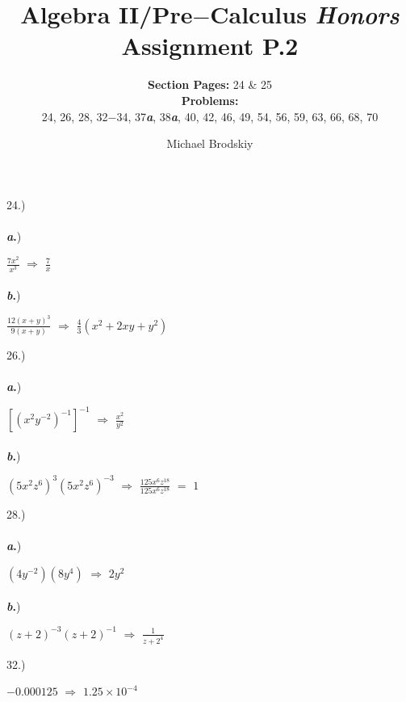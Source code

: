 \documentclass[12pt]{article}
\title{\textbf{Algebra II/Pre$-$Calculus \textit{Honors}}  \\ Assignment P.2}
\date{}
\subtitle{\textbf{Section Pages:} 24 \& 25\\\textbf{Problems:}\\24, 26, 28, 32$-$34, 37\textbf{\textit{a}}, 38\textbf{\textit{a}}, 40, 42, 46, 49, 54, 56, 59, 63, 66, 68, 70}
\author{Michael Brodskiy}
\begin{document}
\maketitle
{\setlength{\parindent}{0cm}
24.)
    \paragraph{} \textbf{\textit{a}.})
        \begin{center} $\frac{7x^2}{x^3}$ $\Longrightarrow$ $\frac{7}{x}$ \end{center} 
    \paragraph{} \textbf{\textit{b}.})
        \begin{center} $\frac{12(x+y)^3}{9(x+y)}$ $\Longrightarrow$ $\frac{4}{3}(x^2+2xy+y^2)$ \end{center} 
}
{\setlength{\parindent}{0cm}
26.) 
    \paragraph{} \textbf{\textit{a}.})
        \begin{center} $[(x^2y^{-2})^{-1}]^{-1}$ $\Longrightarrow$ $\frac{x^2}{y^2}$ \end{center} 
    \paragraph{} \textbf{\textit{b}.})
        \begin{center} $(5x^2z^6)^3(5x^2z^6)^{-3}$ $\Longrightarrow$ $\frac{125x^6z^{18}}{125x^6z^{18}}$ $=$ $1$ \end{center} 
}
{\setlength{\parindent}{0cm}
28.) 
    \paragraph{} \textbf{\textit{a}.})
        \begin{center} $(4y^{-2})(8y^4)$ $\Longrightarrow$ $2y^2$ \end{center} 
    \paragraph{} \textbf{\textit{b}.})
        \begin{center} $(z+2)^{-3}(z+2)^{-1}$ $\Longrightarrow$ $\frac{1}{z+2^4}$ \end{center} 
}
{\setlength{\parindent}{0cm}
32.)
    \begin{center} $-0.000125$ $\Longrightarrow$ $1.25\times10^{-4}$ \end{center}
}
\end{document}
